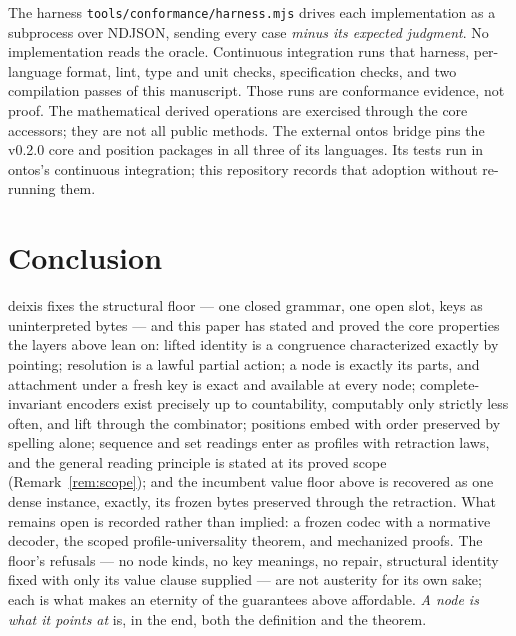\documentclass[11pt]{article}
\theoremstyle{definition}
\begin{document}
The harness \texttt{tools/conformance/harness.mjs} drives each implementation as a
subprocess over NDJSON, sending every case \emph{minus its expected judgment}.
No implementation reads the oracle. Continuous integration runs that harness,
per-language format, lint, type and unit checks, specification checks, and two
compilation passes of this manuscript. Those runs are conformance evidence, not
proof. The mathematical derived operations are exercised through the core
accessors; they are not all public methods. The external ontos bridge pins the
v0.2.0 core and position packages in all three of its languages. Its tests run in
ontos's continuous integration; this repository records that adoption without
re-running them.

\section{Conclusion}

deixis fixes the structural floor --- one closed grammar, one open slot, keys as
uninterpreted bytes --- and this paper has stated and proved the core properties the
layers above lean on: lifted identity is a congruence characterized exactly by
pointing; resolution is a lawful partial action; a node is exactly its parts, and
attachment under a fresh key is exact and available at every node; complete-invariant encoders exist
precisely up to countability, computably only strictly less often, and lift through
the combinator; positions embed with order preserved by spelling alone; sequence and
set readings enter as profiles with retraction laws, and the general reading
principle is stated at its proved scope (Remark~\ref{rem:scope}); and the incumbent
value floor above is recovered as one dense instance, exactly, its frozen bytes
preserved through the retraction. What remains open is recorded rather than implied:
a frozen codec with a normative decoder, the scoped profile-universality theorem, and
mechanized proofs. The floor's refusals --- no node kinds, no key meanings, no
repair, structural identity fixed with only its value clause supplied --- are not
austerity for its own sake; each is what makes an eternity of the guarantees above
affordable. \emph{A node is what it points at} is, in the end, both the definition
and the theorem.
\end{document}
